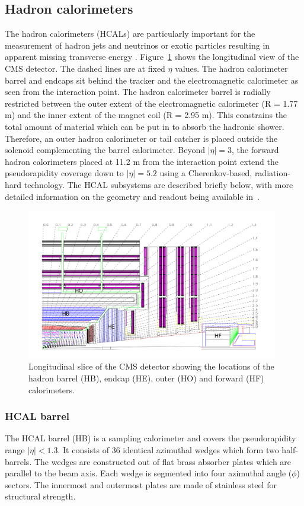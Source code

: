 \subsection{Hadron calorimeters}
The hadron calorimeters (HCALs) are particularly important for the measurement of hadron jets and neutrinos or exotic particles resulting in apparent missing transverse energy \cite{CMSTDR}.
Figure~\ref{fig:hcalslice} shows the longitudinal view of the CMS detector. The dashed lines are at fixed $\eta$ values. 
The hadron calorimeter barrel and endcaps sit behind the tracker and the electromagnetic
calorimeter as seen from the interaction point. The hadron calorimeter barrel is radially restricted
between the outer extent of the electromagnetic calorimeter (R = 1.77 m) and the inner extent of
the magnet coil (R = 2.95 m). This constrains the total amount of material which can be put in
to absorb the hadronic shower. Therefore, an outer hadron calorimeter or tail catcher is placed
outside the solenoid complementing the barrel calorimeter. Beyond $|\eta| = 3$, the forward hadron
calorimeters placed at 11.2 m from the interaction point extend the pseudorapidity coverage down
to $|\eta| = 5.2$ using a Cherenkov-based, radiation-hard technology.
The HCAL subsystems are described briefly below, with more detailed information on the geometry and 
readout being available in~\cite{CMSTDR}.
\begin{figure}
\centering
\includegraphics[width=0.98\textwidth]{figures/hcalslice.png}
\caption{Longitudinal slice of the CMS detector showing the locations of the hadron barrel
(HB), endcap (HE), outer (HO) and forward (HF) calorimeters.}
\label{fig:hcalslice}
\end{figure}

\subsubsection{HCAL barrel}
The HCAL barrel (HB) is a sampling calorimeter and covers the pseudorapidity range $|\eta| < 1.3$.
It consists of 36 identical azimuthal wedges which form two half-barrels. 
The wedges are constructed out of flat brass absorber plates which are parallel
to the beam axis.  Each wedge is segmented into four azimuthal angle ($\phi$) sectors. 
The innermost and outermost plates are made of stainless steel for structural strength.

